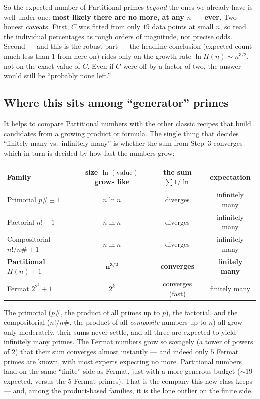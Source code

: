 \documentclass[11pt,a4paper]{article}
\newcommand{\Part}{\Pi}                 %
\begin{document}
\noindent
So the expected number of Partitional primes \emph{beyond} the ones we already
have is well under one: \textbf{most likely there are no more, at any $n$ ---
ever.} Two honest caveats. First, $C$ was fitted from only $19$ data points at
small $n$, so read the individual percentages as rough orders of magnitude, not
precise odds. Second --- and this is the robust part --- the headline conclusion
(expected count much less than $1$ from here on) rides only on the growth rate
$\ln\Part(n)\sim n^{3/2}$, not on the exact value of $C$. Even if $C$ were off by
a factor of two, the answer would still be ``probably none left.''

\subsection*{Where this sits among ``generator'' primes}

It helps to compare Partitional numbers with the other classic recipes that build
candidates from a growing product or formula. The single thing that decides
``finitely many vs.\ infinitely many'' is whether the sum from Step~3 converges
--- which in turn is decided by how fast the numbers grow:

\begin{center}
\begin{tabular}{@{}lccc@{}}
\toprule
\textbf{Family} & \textbf{size $\ln(\text{value})$ grows like} & \textbf{the sum $\sum 1/\ln$} & \textbf{expectation}\\
\midrule
Primorial $p\#\pm1$          & $n\ln n$   & diverges & infinitely many\\
Factorial $n!\pm1$           & $n\ln n$   & diverges & infinitely many\\
Compositorial $n!/n\#\pm1$   & $n\ln n$   & diverges & infinitely many\\
\rowcolor{gray!15}
\textbf{Partitional $\Part(n)\pm1$} & $\mathbf{n^{3/2}}$ & \textbf{converges} & \textbf{finitely many}\\
Fermat $2^{2^k}+1$           & $2^k$      & converges (fast) & finitely many\\
\bottomrule
\end{tabular}
\end{center}

\noindent
The primorial ($p\#$, the product of all primes up to $p$), the factorial, and
the compositorial ($n!/n\#$, the product of all \emph{composite} numbers up to
$n$) all grow only moderately, their sums never settle, and all three are
expected to yield infinitely many primes. The Fermat numbers grow so savagely (a
tower of powers of $2$) that their sum converges almost instantly --- and indeed
only $5$ Fermat primes are known, with most experts expecting no more.
Partitional numbers land on the same ``finite'' side as Fermat, just with a more
generous budget (${\sim}19$ expected, versus the $5$ Fermat primes). That is the
company this new class keeps --- and, among the product-based families, it is the
lone outlier on the finite side.
\end{document}
